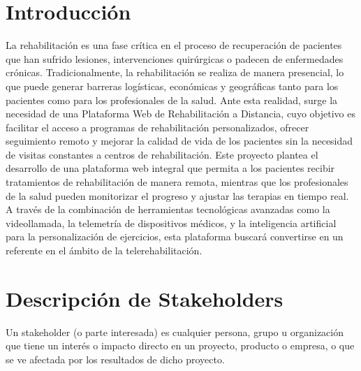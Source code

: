\documentclass{article}
\begin{document}
	\section{Introducción}
	La rehabilitación es una fase crítica en el proceso de recuperación de pacientes que han
	sufrido lesiones, intervenciones quirúrgicas o padecen de enfermedades crónicas.
	Tradicionalmente, la rehabilitación se realiza de manera presencial, lo que puede generar
	barreras logísticas, económicas y geográficas tanto para los pacientes como para los
	profesionales de la salud. Ante esta realidad, surge la necesidad de una Plataforma Web de
	Rehabilitación a Distancia, cuyo objetivo es facilitar el acceso a programas de rehabilitación
	personalizados, ofrecer seguimiento remoto y mejorar la calidad de vida de los pacientes sin
	la necesidad de visitas constantes a centros de rehabilitación.
	Este proyecto plantea el desarrollo de una plataforma web integral que permita a los
	pacientes recibir tratamientos de rehabilitación de manera remota, mientras que los
	profesionales de la salud pueden monitorizar el progreso y ajustar las terapias en tiempo real.
	A través de la combinación de herramientas tecnológicas avanzadas como la videollamada,
	la telemetría de dispositivos médicos, y la inteligencia artificial para la personalización de
	ejercicios, esta plataforma buscará convertirse en un referente en el ámbito de la telerehabilitación.
	
	\section{Descripción de Stakeholders}
	
	Un stakeholder (o parte interesada) es cualquier persona, grupo u organización que tiene un interés o impacto directo en un proyecto, producto o empresa, o que se ve afectada por los resultados de dicho proyecto. 
	
\end{document}
